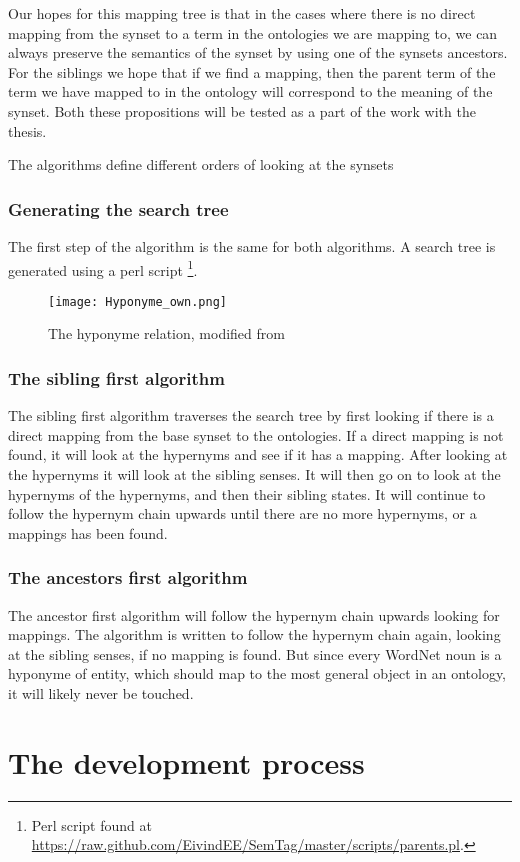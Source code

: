 Our hopes for this mapping tree is that in the cases where there is no direct mapping from the synset to a term in the 
ontologies we are mapping to, we can always preserve the semantics of the synset by using one of the synsets ancestors.
For the siblings we hope that if we find a mapping, 
then the parent term of the term we have mapped to in the ontology will correspond to the meaning of the synset.
Both these propositions will be tested as a part of the work with the thesis.

The algorithms define different orders of looking at the synsets

\subsubsection{Generating the search tree}
The first step of the algorithm is the same for both algorithms.
A search tree is generated using a perl script 
\footnote{Perl script found at \url{https://raw.github.com/EivindEE/SemTag/master/scripts/parents.pl}.}.

\begin{figure}[h]
    \begin{center}
        \texttt{[image: Hyponyme\_own.png]}
        \caption{The hyponyme relation, modified from \protect \citet{Miller1990}}
        \label{Hyponyme}
    \end{center}
\end{figure}



\subsubsection{The sibling first algorithm}
The sibling first algorithm traverses the search tree by first looking if there is a direct mapping from the base synset to the ontologies. 
If a direct mapping is not found, it will look at the hypernyms and see if it has a mapping. 
After looking at the hypernyms it will look at the sibling senses. 
It will then go on to look at the hypernyms of the hypernyms, and then their sibling states. 
It will continue to follow the hypernym chain upwards until there are no more hypernyms, or a mappings has been found.

\subsubsection{The ancestors first algorithm}
The ancestor first algorithm will follow the hypernym chain upwards looking for mappings.
The algorithm is written to follow the hypernym chain again, looking at the sibling senses, if no mapping is found.
But since every WordNet noun is a hyponyme of {entity}, which should map to the most general object in an ontology,
it will likely never be touched.

\section{The development process}
